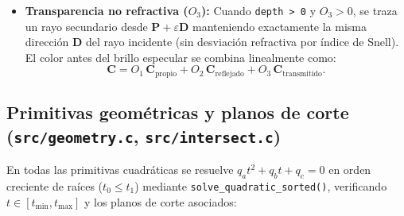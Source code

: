 \documentclass[11pt,letterpaper]{article}
\begin{document}
\begin{itemize}[leftmargin=1.5em]
    \item \textbf{Transparencia no refractiva ($O_3$):} Cuando \texttt{depth > 0} y $O_3 > 0$, se traza un rayo secundario desde $\mathbf{P} + \varepsilon\mathbf{D}$ manteniendo exactamente la misma dirección $\mathbf{D}$ del rayo incidente (sin desviación refractiva por índice de Snell). El color antes del brillo especular se combina linealmente como:
    \[
        \mathbf{C} = O_1\,\mathbf{C}_{\text{propio}} + O_2\,\mathbf{C}_{\text{reflejado}} + O_3\,\mathbf{C}_{\text{transmitido}}.
    \]
\end{itemize}

\subsection{Primitivas geométricas y planos de corte (\texttt{src/geometry.c}, \texttt{src/intersect.c})}

En todas las primitivas cuadráticas se resuelve $q_a t^2 + q_b t + q_c = 0$ en orden creciente de raíces ($t_0 \le t_1$) mediante \texttt{solve\_quadratic\_sorted()}, verificando $t \in [t_{\min}, t_{\max}]$ y los planos de corte asociados:
\end{document}
